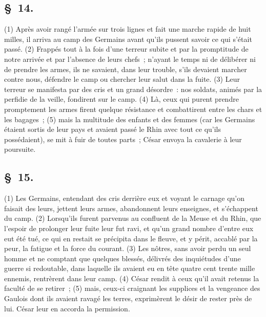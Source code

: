 \documentclass[french,twoside]{book} %
\begin{document}
\subsection[{§ 14.}]{ \textsc{§ 14.} }
\noindent (1) Après avoir rangé l’armée sur trois lignes et fait une marche rapide de huit milles, il arriva au camp des Germains avant qu’ils pussent savoir ce qui s’était passé. (2) Frappés tout à la fois d’une terreur subite et par la promptitude de notre arrivée et par l’absence de leurs chefs ; n’ayant le temps ni de délibérer ni de prendre les armes, ils ne savaient, dans leur trouble, s’ils devaient marcher contre nous, défendre le camp ou chercher leur salut dans la fuite. (3) Leur terreur se manifesta par des cris et un grand désordre : nos soldats, animés par la perfidie de la veille, fondirent sur le camp. (4) Là, ceux qui purent prendre promptement les armes firent quelque résistance et combattirent entre les chars et les bagages ; (5) mais la multitude des enfants et des femmes (car les Germains étaient sortis de leur pays et avaient passé le Rhin avec tout ce qu’ils possédaient), se mit à fuir de toutes parts ; César envoya la cavalerie à leur poursuite.
\subsection[{§ 15.}]{ \textsc{§ 15.} }
\noindent (1) Les Germains, entendant des cris derrière eux et voyant le carnage qu’on faisait des leurs, jettent leurs armes, abandonnent leurs enseignes, et s’échappent du camp. (2) Lorsqu’ils furent parvenus au confluent de la Meuse et du Rhin, que l’espoir de prolonger leur fuite leur fut ravi, et qu’un grand nombre d’entre eux eut été tué, ce qui en restait se précipita dans le fleuve, et y périt, accablé par la peur, la fatigue et la force du courant. (3) Les nôtres, sans avoir perdu un seul homme et ne comptant que quelques blessés, délivrés des inquiétudes d’une guerre si redoutable, dans laquelle ils avaient eu en tête quatre cent trente mille ennemis, rentrèrent dans leur camp. (4) César rendit à ceux qu’il avait retenus la faculté de se retirer ; (5) mais, ceux-ci craignant les supplices et la vengeance des Gaulois dont ils avaient ravagé les terres, exprimèrent le désir de rester près de lui. César leur en accorda la permission.
\end{document}
